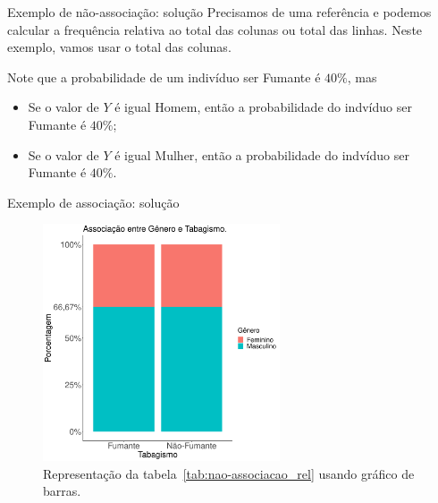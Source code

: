 \documentclass[9pt]{beamer}
\begin{document}
\begin{frame}{Exemplo de não-associação: solução}
Precisamos de uma referência e podemos calcular a frequência relativa ao total das colunas ou total das linhas. Neste exemplo, vamos usar o total das colunas.
\begin{table}[htbp]
	\centering
	\caption{Tabela de distribuição de frequência relativa ao total das colunas.}
	\label{tab:nao-associacao_rel}
\end{table} 

Note que a probabilidade de um indivíduo ser Fumante é {\color{red} $40\%$}, mas
\begin{itemize}
	\item Se o valor de $Y$ é igual Homem, então a probabilidade do indvíduo ser Fumante é {\color{brown} $40\%$};
	\item Se o valor de $Y$ é igual Mulher, então a probabilidade do indvíduo ser Fumante é {\color{blue} $40\%$}.
\end{itemize}
\end{frame}

\begin{frame}{Exemplo de associação: solução}

\begin{figure}[htbp]
	\centering
	\includegraphics[width = 7cm]{figures/nao_associacao.png}
	\caption{Representação da tabela~\ref{tab:nao-associacao_rel} usando gráfico de barras.}
	\label{tab:graph-nao-associacao}
\end{figure}

\end{frame}
\end{document}
